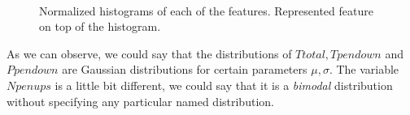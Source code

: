 \documentclass[a4paper]{article}
\begin{document}
{\begin{figure}[H]
  \centering
  \qquad
  \\
  \qquad%
  \caption{Normalized histograms of each of the features. Represented feature on top of the histogram.}
  \label{fig:four:signals:2}
\end{figure}


As we can observe, we could say that the distributions of \(Ttotal, Tpendown\) and \(Ppendown\) are Gaussian distributions for certain parameters \(\mu,\sigma\). The variable \(Npenups\) is a little bit different, we could say that it is a \emph{bimodal} distribution without specifying any particular named distribution.

}
\end{document}
